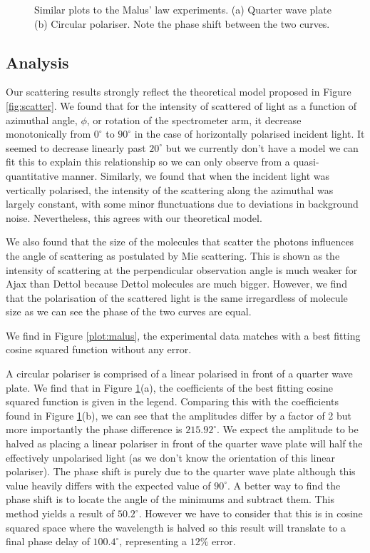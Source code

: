 \documentclass{article}
\begin{document}
\begin{figure} [H]
    \centering
    \scalebox{0.5}{}
    \hspace{0.5cm}
    \scalebox{0.5}{}
    \caption{Similar plots to the Malus' law experiments. (a) Quarter
    wave plate (b) Circular polariser. Note the phase shift between 
    the two curves.}
    \label{plot:quartercirc}
\end{figure}

\subsection{Analysis}
Our scattering results strongly reflect the theoretical model proposed 
in Figure \ref{fig:scatter}. We found that for the intensity of 
scattered of light as a function of azimuthal angle, $\phi$, or rotation 
of the spectrometer arm, it decrease monotonically from $0^\circ$ to 
$90^\circ$ in the case of horizontally polarised incident light. It 
seemed to decrease linearly past $20^\circ$ but we currently don't have 
a model we can fit this to explain this relationship so we can only 
observe from a quasi-quantitative manner. Similarly, we found that 
when the incident light was vertically polarised, the intensity of the 
scattering along the azimuthal was largely constant, with some minor 
flunctuations due to deviations in background noise. Nevertheless, this 
agrees with our theoretical model.

We also found that the size of the molecules that scatter the photons 
influences the angle of scattering as postulated by Mie scattering. 
This is shown as the intensity of scattering at the perpendicular 
observation angle is much weaker for Ajax than Dettol because Dettol 
molecules are much bigger. However, we find that the polarisation of 
the scattered light is the same irregardless of molecule size as we 
can see the phase of the two curves are equal.

We find in Figure \ref{plot:malus}, the experimental data matches with 
a best fitting cosine squared function without any error.

A circular polariser is comprised of a linear polarised in front of
a quarter wave plate. We find that in Figure \ref{plot:quartercirc}(a),
the coefficients of the best fitting cosine squared function is given 
in the legend. Comparing this with the coefficients found in Figure
\ref{plot:quartercirc}(b), we can see that the amplitudes differ by 
a factor of 2 but more importantly the phase difference is $215.92
^\circ$. We expect the amplitude to be halved as placing a linear 
polariser in front of the quarter wave plate will half the effectively
unpolarised light (as we don't know the orientation of this linear 
polariser). The phase shift is purely due to the quarter wave plate 
although this value heavily differs with the expected value of $90^\circ$. 
A better way to find the phase shift is to locate the angle 
of the minimums and subtract them. This method yields a result of 
$50.2^\circ$. However we have to consider that this is in cosine 
squared space where the wavelength is halved so this result will 
translate to a final phase delay of $100.4^\circ$, representing a 
$12\%$ error.
\end{document}
